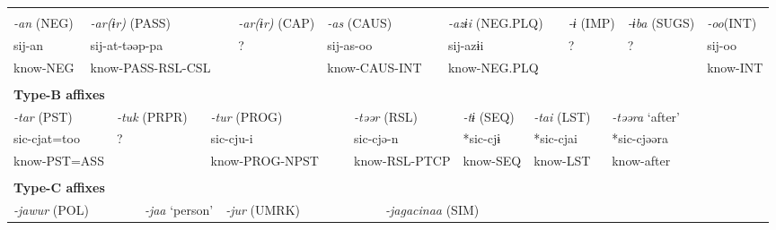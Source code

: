 \tabletail{}
\tablelasttail{}
\begin{tabularx}{\textwidth}{XXXXXXXXXXXXXXXXXXXXXX}
\lsptoprule
\multicolumn{22}{X}{{\bfseries Type-A affixes}}\\
{ \textit{{}-an} (NEG)} & \multicolumn{7}{X}{{ \textit{{}-ar(ɨr)} (PASS)}} & \multicolumn{2}{X}{{ \textit{{}-ar(ɨr)} (CAP)}} & \multicolumn{4}{X}{{ \textit{{}-as} (CAUS)}} & \multicolumn{4}{X}{{ \textit{{}-azɨi} (NEG.PLQ)}} & \multicolumn{2}{X}{{ \textit{{}-ɨ} (IMP)}} & { \textit{{}-ɨba} (SUGS)} & { \textit{{}-oo}(INT)}\\
{ sij-an} & \multicolumn{7}{X}{{ sij-at-təəp-pa}} & \multicolumn{2}{X}{{ ?}} & \multicolumn{4}{X}{{ sij-as-oo}} & \multicolumn{4}{X}{{ sij-azɨi}} & \multicolumn{2}{X}{{ ?}} & { ?} & { sij-oo}\\
know-NEG & \multicolumn{7}{X}{know-PASS-RSL-CSL} & \multicolumn{2}{X}{} & \multicolumn{4}{X}{know-CAUS-INT} & \multicolumn{4}{X}{know-NEG.PLQ} & \multicolumn{2}{X}{} &  & know-INT\\
\multicolumn{22}{X}{}\\
\multicolumn{22}{X}{{\bfseries Type-B affixes}}\\
\multicolumn{3}{X}{{ \textit{{}-tar} (PST)}} & \multicolumn{3}{X}{{ \textit{{}-tuk} (PRPR)}} & \multicolumn{5}{X}{{ \textit{{}-tur} (PROG)}} & \multicolumn{4}{X}{{ \textit{{}-təər} (RSL)}} & \multicolumn{2}{X}{{ \textit{{}-tɨ} (SEQ)}} & \multicolumn{2}{X}{{ \textit{{}-tai} (LST)}} & \multicolumn{3}{X}{{ \textit{{}-təəra} ‘after’}}\\
\multicolumn{3}{X}{{ sic-cjat=too}} & \multicolumn{3}{X}{{ ?}} & \multicolumn{5}{X}{{ sic-cju-i}} & \multicolumn{4}{X}{{ sic-cjə-n}} & \multicolumn{2}{X}{{ *sic-cjɨ}} & \multicolumn{2}{X}{{ *sic-cjai}} & \multicolumn{3}{X}{{ *sic-cjəəra}}\\
\multicolumn{3}{X}{know-PST=ASS} & \multicolumn{3}{X}{} & \multicolumn{5}{X}{know-PROG-NPST} & \multicolumn{4}{X}{know-RSL-PTCP} & \multicolumn{2}{X}{know-SEQ} & \multicolumn{2}{X}{know-LST} & \multicolumn{3}{X}{{ know-after}}\\
\multicolumn{3}{X}{} & \multicolumn{3}{X}{} & \multicolumn{5}{X}{} & \multicolumn{4}{X}{} & \multicolumn{2}{X}{} & \multicolumn{2}{X}{} & \multicolumn{3}{X}{}\\
\multicolumn{22}{X}{{\bfseries Type-C affixes}}\\
\multicolumn{4}{X}{{ \textit{{}-jawur} (POL)}} & \multicolumn{3}{X}{{ \textit{{}-jaa} ‘person’}} & \multicolumn{5}{X}{{ \textit{{}-jur} (UMRK)}} & \multicolumn{4}{X}{{ \textit{{}-jagacinaa} (SIM)}} & \multicolumn{6}{X}{}\\

\end{tabularx}
